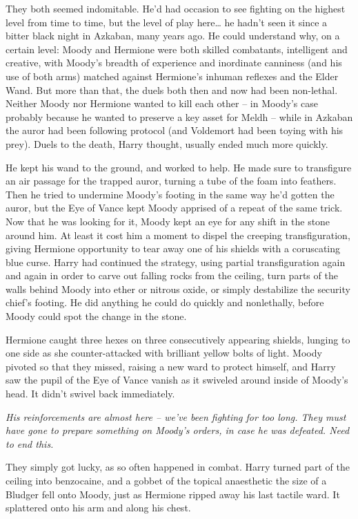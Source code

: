 They both seemed indomitable. He'd had occasion to see fighting on the
highest level from time to time, but the level of play here\ldots{} he
hadn't seen it since a bitter black night in Azkaban, many years ago. He
could understand why, on a certain level: Moody and Hermione were both
skilled combatants, intelligent and creative, with Moody's breadth of
experience and inordinate canniness (and his use of both arms) matched
against Hermione's inhuman reflexes and the Elder Wand. But more than
that, the duels both then and now had been non-lethal. Neither Moody nor
Hermione wanted to kill each other -- in Moody's case probably because
he wanted to preserve a key asset for Meldh -- while in Azkaban the
auror had been following protocol (and Voldemort had been toying with
his prey). Duels to the death, Harry thought, usually ended much more
quickly.

He kept his wand to the ground, and worked to help. He made sure to
transfigure an air passage for the trapped auror, turning a tube of the
foam into feathers. Then he tried to undermine Moody's footing in the
same way he'd gotten the auror, but the Eye of Vance kept Moody apprised
of a repeat of the same trick. Now that he was looking for it, Moody
kept an eye for any shift in the stone around him. At least it cost him
a moment to dispel the creeping transfiguration, giving Hermione
opportunity to tear away one of his shields with a coruscating blue
curse. Harry had continued the strategy, using partial transfiguration
again and again in order to carve out falling rocks from the ceiling,
turn parts of the walls behind Moody into ether or nitrous oxide, or
simply destabilize the security chief's footing. He did anything he
could do quickly and nonlethally, before Moody could spot the change in
the stone.

Hermione caught three hexes on three consecutively appearing shields,
lunging to one side as she counter-attacked with brilliant yellow bolts
of light. Moody pivoted so that they missed, raising a new ward to
protect himself, and Harry saw the pupil of the Eye of Vance vanish as
it swiveled around inside of Moody's head. It didn't swivel back
immediately.

\emph{His reinforcements are almost here -- we've been fighting for too
long. They must have gone to prepare something on Moody's orders, in
case he was defeated. Need to end this.}

They simply got lucky, as so often happened in combat. Harry turned part
of the ceiling into benzocaine, and a gobbet of the topical anaesthetic
the size of a Bludger fell onto Moody, just as Hermione ripped away his
last tactile ward. It splattered onto his arm and along his chest.

